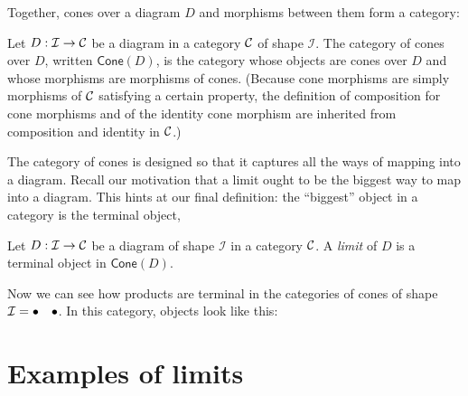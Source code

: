 Together, cones over a diagram \(D\) and morphisms between them form a category:
\begin{definition}
  \sloppy
  Let \(D :\mathcal I \to \mathcal C\) be a diagram in a category \(\mathcal C\) of shape \(\mathcal I\).
  The category of cones over \(D\), written \(\mathsf{Cone}(D)\),
  is the category whose objects are cones over \(D\) and whose morphisms are morphisms of cones.
  (Because cone morphisms are simply morphisms of \(\mathcal C\) satisfying a certain property,
   the definition of composition for cone morphisms and of the identity cone morphism are inherited from
   composition and identity in \(\mathcal C\).)
\end{definition}

The category of cones is designed so that it captures all the ways of 
mapping into a diagram.
Recall our motivation that a limit ought to be the biggest way to map into a 
diagram. This hints at our final definition: the ``biggest'' object in a category is 
the terminal object, 

\begin{definition}[Limit]
  Let \(D : \mathcal I \to \mathcal C\) be a diagram of shape \(\mathcal I\)
  in a category \(\mathcal C\).
  A \emph{limit} of \(D\) is a terminal object in $\mathsf{Cone}(D)$.
\end{definition}

Now we can see how products are terminal in the categories of cones 
of shape $\mathcal I = \bullet \quad \bullet$.
In this category, objects look like this:





\section{Examples of limits}

